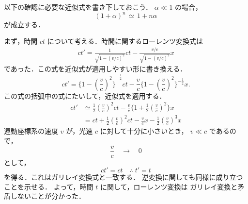 \begin{mycomment}
以下の確認に必要な近似式を書き下しておこう．
$\alpha \ll 1$ の場合，
    \begin{equation*}
        (1+\alpha )^{n}\,\simeq\, 1+n\alpha
    \end{equation*}
が成立する．
\end{mycomment}

まず，時間 $ct$ について考える．時間に関するローレンツ変換式は
    \begin{align*}
    ct'=\frac{1}{\sqrt{ 1-(v/c)^{2} }} ct -\frac{v/c}{\sqrt{ 1-(v/c)^{2} }} x
    \end{align*}
であった．この式を近似式が適用しやすい形に書き換える．
    \begin{equation*}
    ct'={\biggl\{{ 1-\left(\frac{v}{c}\right)^{2} }\biggr\}}^{-\frac{1}{2}} ct -\frac{v}{c}\biggl\{{{ 1-\left(\frac{v}{c}\right)^{2} }}\biggr\}^{-\frac{1}{2}} x.
    \end{equation*}
この式の括弧中の式にたいして，近似式を適用する．
    \begin{align*}
        ct'&\simeq \frac{1}{2}\left(\frac{v}{c}\right)^{2}ct-\frac{v}{c}\biggl\{1+\frac{1}{2}\left(\frac{v}{c}\right)^{2}\biggr\}x \\
           &= ct + \frac{1}{2}\left(\frac{v}{c}\right)^{2}ct-\frac{v}{c}x-\frac{1}{2}\left(\frac{v}{c}\right)^{3}x
    \end{align*}
運動座標系の速度 $v$ が，光速 $c$ に対して十分に小さいとき，
$v\ll c$ であるので，
    \begin{equation*}
    \frac{v}{c}\quad \longrightarrow \quad 0
    \end{equation*}
として，
    \begin{equation*}
    ct'=ct \quad \therefore\; t'=t
    \end{equation*}
を得る．これはガリレイ変換式と一致する．
逆変換に関しても同様に成り立つことを示せる．
よって，時間 $t$ に関して，ローレンツ変換は
ガリレイ変換と矛盾しないことが分かった．

